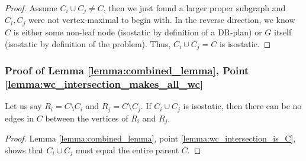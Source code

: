 \begin{proof}
Assume $C_i\cup C_j \neq C$, then we just found a larger proper subgraph and $C_i,C_j$ were not vertex-maximal to begin with.
%
In the reverse direction, we know $C$ is either some non-leaf node (isostatic by definition of a DR-plan) or $G$ itself (isostatic by definition of the problem). Thus, $C_i\cup C_j=C$ is isostatic.
\end{proof}


\subsubsection{Proof of Lemma \ref{lemma:combined_lemma}, Point \ref{lemma:wc_intersection_makes_all_wc}}

\begin{observation}\label{observation:no_edges_between_diff}
Let us say $R_i=C\setminus C_i$ and $R_j=C\setminus C_j$. If $C_i\cup C_j$ is isostatic, then there can be no edges in $C$ between the vertices of $R_i$ and $R_j$.
\end{observation}

\begin{proof}
Lemma \ref{lemma:combined_lemma}, point \ref{lemma:wc_intersection_is_C}, shows that $C_i\cup C_j$ must equal the entire parent $C$.
\end{proof}


